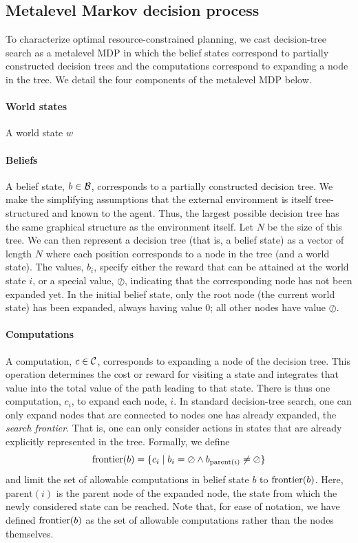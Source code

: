 \subsection{Metalevel Markov decision process}

To characterize optimal resource-constrained planning, we cast decision-tree search as a metalevel MDP in which the belief states correspond to partially constructed decision trees and the computations correspond to expanding a node in the tree. We detail the four components of the metalevel MDP below.

\paragraph{World states}

A world state $w$ 

\paragraph{Beliefs}

A belief state, $b \in \mathcal{B}$, corresponds to a partially constructed decision tree. We make the simplifying assumptions that the external environment is itself tree-structured and known to the agent. Thus, the largest possible decision tree has the same graphical structure as the environment itself. Let $N$ be the size of this tree. We can then represent a decision tree (that is, a belief state) as a vector of length $N$ where each position corresponds to a node in the tree (and a world state). The values, $b_i$, specify either the reward that can be attained at the world state $i$, or a special value, $\oslash$, indicating that the corresponding node has not been expanded yet. In the initial belief state, only the root node (the current world state) has been expanded, always having value $0$; all other nodes have value $\oslash$.

\paragraph{Computations}

A computation, $c \in \mathcal{C}$, corresponds to expanding a node of the decision tree. This operation determines the cost or reward for visiting a state and integrates that value into the total value of the path leading to that state. There is thus one computation, $c_i$, to expand each node, $i$. In standard decision-tree search, one can only expand nodes that are connected to nodes one has already expanded, the \emph{search frontier}. That is, one can only consider actions in states that are already explicitly represented in the tree. Formally, we define
\begin{equation}
\mathrm{frontier}(b) = \{c_i \mid b_i = \oslash \wedge b_{\mathrm{parent}(i)} \neq \oslash \}
\end{equation}
and limit the set of allowable computations in belief state $b$ to $\mathrm{frontier}(b)$. Here, $\mathrm{parent}(i)$ is the parent node of the expanded node, the state from which the newly considered state can be reached. Note that, for ease of notation, we have defined $\mathrm{frontier}(b)$ as the set of allowable computations rather than the nodes themselves.

